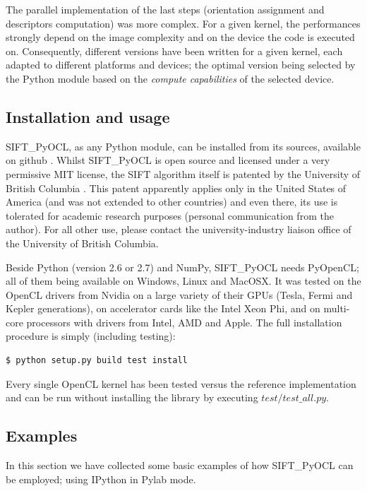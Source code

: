 \documentclass[preprint]{iucr}
\begin{document}
The parallel implementation of the last steps (orientation assignment and
descriptors computation) was more complex.
For a given kernel, the performances strongly depend on the image
complexity and on the device the code is executed on.
Consequently, different versions have been written for a given kernel, each
adapted to different platforms and
devices; the optimal version being selected by the
Python module based on the \emph{compute capabilities} of the selected device.


\subsection{Installation and usage}
SIFT\_PyOCL, as any Python module, can be installed from its sources,
available on github \cite{sift_pyocl}.
Whilst SIFT\_PyOCL is open source and licensed under a very
permissive MIT license, the SIFT algorithm itself is
patented by the University of British Columbia \cite{SIFT_pat}.
This patent apparently applies only in the United States of America
(and was not extended to other countries) and even there, its use is
tolerated for academic research purposes (personal communication from the
author). For all other use, please contact the university-industry liaison
office of the University of British Columbia. 

Beside Python (version 2.6 or 2.7) and NumPy, SIFT\_PyOCL needs
PyOpenCL; all of them being available on Windows, Linux and MacOSX. 
It was tested on the OpenCL drivers from Nvidia on a
large variety of their GPUs (Tesla, Fermi and Kepler generations), on
accelerator cards like the Intel Xeon Phi,  and on multi-core processors with
drivers from Intel, AMD and Apple. 
The full installation procedure is simply (including testing):
\begin{verbatim}
$ python setup.py build test install
\end{verbatim} 
Every single OpenCL kernel has been tested versus the reference
implementation and can be run without installing the library by
executing $test/test\_all.py$. 

\subsection{Examples}

In this section we have collected some basic examples of how
SIFT\_PyOCL can be employed; using IPython \cite{ipython} in
Pylab \cite{matplotlib} mode.
\end{document}

